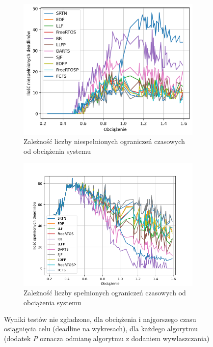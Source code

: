 \documentclass[../../main]{subfiles}
\begin{document}
\begin{figure}[h]
    \centering
    \begin{subfigure}{0.85\textwidth}
        \includegraphics[width=1\textwidth]{Images/diagrams/loadfactor-misses-notsmoothed.png}
        \caption{Zależność liczby niespełnionych ograniczeń czasowych od obciążenia systemu}
        \label{fig:loadfactor-misses-notsmoothed}
    \end{subfigure}
    \hfill
    \begin{subfigure}{1\textwidth}
        \includegraphics[width=1\textwidth]{Images/diagrams/loadfactor-catches-notsmoothed.png}
        \caption{Zależność liczby spełnionych ograniczeń czasowych od obciążenia systemu}
        \label{fig:loadfactor-catches-notsmoothed}
    \end{subfigure}
    \caption{Wyniki testów nie zgładzone, dla obciążenia i najgorszego czasu osiągnięcia celu (deadline na wykresach), dla każdego algorytmu (dodatek \textit{P} oznacza odmianę algorytmu z dodaniem wywłaszczania)}
    \label{fig:results-notsmoothed-loadfactor}
\end{figure}
\end{document}
